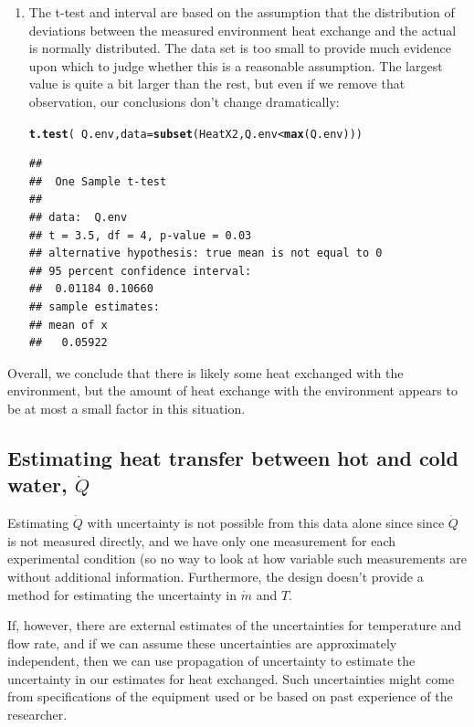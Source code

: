 \documentclass[twoside]{book}\usepackage[]{graphicx}\usepackage[]{xcolor}
\makeatletter
\newcommand{\hlopt}[1]{\textcolor[rgb]{0,0,0}{#1}}%
\newcommand{\hlstd}[1]{\textcolor[rgb]{0.345,0.345,0.345}{#1}}%
\newcommand{\hlkwc}[1]{\textcolor[rgb]{0.333,0.667,0.333}{#1}}%
\newcommand{\hlkwd}[1]{\textcolor[rgb]{0.737,0.353,0.396}{\textbf{#1}}}%
\newenvironment{kframe}{%
 \def\at@end@of@kframe{}%
 \ifinner\ifhmode%
  \def\at@end@of@kframe{\end{minipage}}%
  \begin{minipage}{\columnwidth}%
 \fi\fi%
 \def\FrameCommand##1{\hskip\@totalleftmargin \hskip-\fboxsep
 \colorbox{shadecolor}{##1}\hskip-\fboxsep
     \hskip-\linewidth \hskip-\@totalleftmargin \hskip\columnwidth}%
 \MakeFramed {\advance\hsize-\width
   \@totalleftmargin\z@ \linewidth\hsize
   \@setminipage}}%
 {\par\unskip\endMakeFramed%
 \at@end@of@kframe}
\newenvironment{knitrout}{}{} %
\makeatother
\begin{document}
\begin{enumerate}
\begin{knitrout}
\end{knitrout}
\item
The t-test and interval are based on the assumption that the distribution
of deviations between the measured environment heat exchange and the actual
is normally distributed.  The data set is too small to provide much evidence
upon which to judge whether this is a reasonable assumption.  The largest value is 
quite a bit larger than the rest, but even if we remove that observation, our 
conclusions don't change dramatically:
\begin{knitrout}
\color{fgcolor}\begin{kframe}
\begin{alltt}
\hlkwd{t.test}\hlstd{(} \hlopt{~} \hlstd{Q.env,} \hlkwc{data} \hlstd{=} \hlkwd{subset}\hlstd{(HeatX2, Q.env} \hlopt{<} \hlkwd{max}\hlstd{(Q.env)) )}
\end{alltt}
\begin{verbatim}
## 
## 	One Sample t-test
## 
## data:  Q.env
## t = 3.5, df = 4, p-value = 0.03
## alternative hypothesis: true mean is not equal to 0
## 95 percent confidence interval:
##  0.01184 0.10660
## sample estimates:
## mean of x 
##   0.05922
\end{verbatim}
\end{kframe}
\end{knitrout}
\end{enumerate}

Overall, we conclude that there is likely some heat exchanged with the environment, but 
the amount of heat exchange with the environment
appears to be at most a small factor in this situation.

\subsection{Estimating heat transfer between hot and cold water, $\dot{Q}$}

Estimating $\dot{Q}$ with uncertainty is not possible from this data alone since since 
$\dot{Q}$ is not measured directly, and we have only one measurement for each experimental
condition (so no way to look at how variable such measurements are without additional information.
Furthermore, the design doesn't provide a method for estimating the 
uncertainty in $\dot{m}$ and $T$.

If, however, there are external estimates of the uncertainties for temperature
and flow rate, and if we can assume these uncertainties are approximately
independent, then we can use propagation of uncertainty to estimate the
uncertainty in our estimates for heat exchanged.  Such uncertainties might come 
from specifications of the equipment used or be based on past experience of the
researcher.
\end{document}
